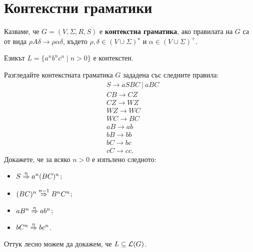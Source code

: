 \section{Контекстни граматики}
Казваме, че $G = (V,\Sigma,R,S)$ е {\bf контекстна граматика}, ако правилата на $G$ са от вида
$\rho A \delta \to \rho \alpha \delta$, където $\rho,\delta \in (V\cup\Sigma)^\star$ и $\alpha \in (V\cup\Sigma)^+$.

\begin{extra}
\begin{example}
  Езикът $L = \{a^nb^nc^n \mid n > 0\}$ е контекстен.
\end{example}
\begin{hint}
  Разгледайте контекстната граматика $G$ зададена със следните правила:
  \begin{align*}
    & S \to aSBC\ |\ aBC\\
    & CB \to CZ\\
    & CZ \to WZ\\
    & WZ \to WC\\
    & WC \to BC\\
    & aB \to ab\\
    & bB \to bb\\
    & bC \to bc\\
    & cC \to cc.
  \end{align*}
  Докажете, че за всяко $n > 0$ е изпълено следното:
  \begin{itemize}
  \item
    $S \stackrel{{n}}{\Rightarrow} a^n(BC)^n$;
  \item
    $(BC)^n \stackrel{{n-1}}{\Rightarrow} B^nC^n$;
  \item
    $aB^n \stackrel{{n}}{\Rightarrow} ab^n$;
  \item
    $bC^n \stackrel{{n}}{\Rightarrow} bc^n$.
  \end{itemize}
  Оттук лесно можем да докажем, че $L \subseteq \mathcal{L}(G)$.
\end{hint}
\end{extra}
